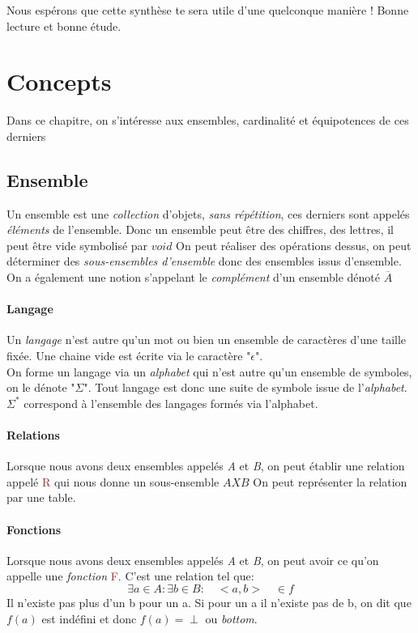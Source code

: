 \documentclass{report}
\begin{document}
Nous espérons que cette synthèse te sera utile d'une quelconque manière ! Bonne lecture et bonne étude.

\chapter{Concepts}
Dans ce chapitre, on s'intéresse aux ensembles, cardinalité et équipotences de ces derniers
\section{Ensemble}
Un ensemble est une \textit{collection} d'objets, \textit{sans répétition}, ces derniers sont appelés \textit{éléments} de l'ensemble.
Donc un ensemble peut être des chiffres, des lettres, il peut être vide symbolisé par $void$ %
On peut réaliser des opérations dessus, on peut déterminer des \textit{sous-ensembles d'ensemble} donc des ensembles issus d'ensemble.
On a également une notion s'appelant le \textit{complément} d'un ensemble dénoté $\overline{A}$\\%

\subsubsection{Langage}
Un \textit{langage} n'est autre qu'un mot ou bien un ensemble de caractères d'une taille fixée. Une chaine vide est écrite via le caractère "$\epsilon$".\\
On forme un langage via un \textit{alphabet} qui n'est autre qu'un ensemble de symboles, on le dénote "$\Sigma$". Tout langage est donc une suite de symbole issue de l'\textit{alphabet}.\\
$\Sigma^*$ correspond à l'ensemble des langages formés via l'alphabet.

\subsubsection{Relations}
Lorsque nous avons deux ensembles appelés \textit{A} et \textit{B}, on peut établir une relation appelé \textcolor{brown}{R} qui nous donne un sous-ensemble $AXB$ %
On peut représenter la relation par une table.

\subsubsection{Fonctions}
Lorsque nous avons deux ensembles appelés \textit{A} et \textit{B}, on peut avoir ce qu'on appelle une \textit{fonction} \textcolor{brown}{F}. C'est une relation tel que:
\begin{equation}
\exists a \in A : \exists b \in B :\quad <a,b> \quad \in f
\end{equation}
Il n'existe pas plus d'un b pour un a. Si pour un a il n'existe pas de b, on dit que $f(a)$ est indéfini et donc $f(a) = \perp$ ou \textit{bottom}.
\end{document}
